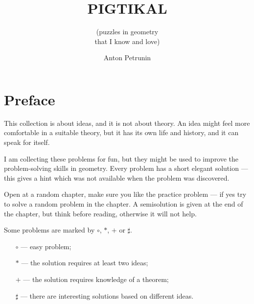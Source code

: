 \documentclass[twoside]{book}
\begin{document}

\title{PIGTIKAL}
\subtitle{(puzzles in geometry\\
that I know and love)}
\author{Anton Petrunin}
\date{}
\maketitle



\thispagestyle{empty}
\tableofcontents
\thispagestyle{empty}

\newpage
\thispagestyle{empty}
\section*{Preface}

This collection is about ideas, and it is not about theory.
An idea might feel more comfortable in a suitable theory,
but it has its own life and history, and it can speak for itself.

I am collecting these problems for fun, 
but they might be used to improve 
the problem-solving skills in geometry.
Every problem has a short elegant solution ---
this gives a hint which was not available
when the problem was discovered.


Open at a random chapter, make sure you like the practice problem --- if yes try to solve a random problem in the chapter.
A semisolution is given at the end of the chapter,
but think before reading,
otherwise it will not help. 

Some problems are marked by $\circ$, $*$, $+$ or $\sharp$.
\begin{itemize}
\item[$\circ$] --- easy problem;%
\item[$*$] --- the solution requires at least two ideas;%
\item[$+$] --- the solution requires knowledge of a theorem;%
\item[$\sharp$] --- there are interesting solutions based on different ideas.%
\end{itemize}
\end{document}
